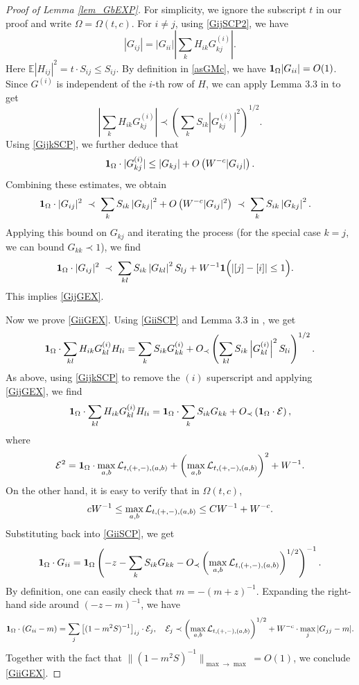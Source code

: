 \documentclass[10pt,reqno]{article}
\theoremstyle{plain} %
\theoremstyle{remark}
\numberwithin{equation}{section}
\begin{document}
\begin{proof}[Proof of Lemma \ref{lem_GbEXP}]
For simplicity, we ignore the subscript \( t \) in our proof and write \( \Omega = \Omega(t, c) \). For \( i \neq j \), using \eqref{GijSCP2}, we have
\[
|G_{ij}| = |G_{ii}| \left| \sum_{k} H_{ik} G^{(i)}_{kj} \right|.
\]
Here \( \mathbb{E} |H_{ij}|^2 = t \cdot S_{ij} \leq S_{ij} \). By definition in \eqref{asGMc}, we have $
{\bf 1}_{\Omega} |G_{ii}| = O(1)$. 
Since \( G^{(i)} \) is independent of the \( i \)-th row of \( H \), we can apply Lemma 3.3 in \cite{erdHos2012rigidity} to get
\[
\left| \sum_{k} H_{ik} G^{(i)}_{kj} \right| \prec 
\left( \sum_{k} S_{ik} \left| G^{(i)}_{kj} \right|^2 \right)^{1/2}.
\]
Using \eqref{GijkSCP}, we further deduce that
\[
{\bf 1}_{\Omega} \cdot |G^{(i)}_{kj}| \leq |G_{kj}| + O\left(W^{-c} |G_{ij}|\right).
\]
Combining these estimates, we obtain
\begin{align}
{\bf 1}_{\Omega} \cdot |G_{ij}|^2 & \;\prec\; \sum_{k} S_{ik} \left| G_{kj} \right|^2 + O\left(W^{-c} |G_{ij}|^2\right) 
 \;\prec\; \sum_{k} S_{ik} \left| G_{kj} \right|^2.
\end{align}
Applying this bound on \( G_{kj} \) and iterating the process (for the special case \( k = j \), we can bound \( G_{kk} \prec 1 \)), we find
\begin{align}
{\bf 1}_{\Omega} \cdot |G_{ij}|^2 & \;\prec\; \sum_{kl} S_{ik} \left| G_{kl} \right|^2 S_{lj} +
W^{-1} {\bf 1}\Big(|[j] - [i]| \leq 1\Big).
\end{align}
This implies \eqref{GijGEX}.

Now we prove \eqref{GiiGEX}. Using \eqref{GiiSCP} and Lemma 3.3 in \cite{erdHos2012rigidity}, we get
\[
{\bf 1}_{\Omega} \cdot \sum_{kl} H_{ik} G^{(i)}_{kl} H_{li} =
\sum_{k} S_{ik} G^{(i)}_{kk} +
O_\prec\left(\sum_{kl} S_{ik} \left| G^{(i)}_{kl} \right|^2 S_{li} \right)^{1/2}.
\]
As above, using \eqref{GijkSCP} to remove the \( (i) \) superscript and applying \eqref{GijGEX}, we find
\[
{\bf 1}_{\Omega} \cdot \sum_{kl} H_{ik} G^{(i)}_{kl} H_{li} =
{\bf 1}_{\Omega} \cdot \sum_{k} S_{ik} G_{kk} + O_\prec\left({\bf 1}_{\Omega} \cdot {\cal E}\right),
\]
where
\[
{\cal E}^2 = {\bf 1}_{\Omega} \cdot \max_{a,b} {\cal L}_{t,(+,-),(a,b)} +
\left(\max_{a,b} {\cal L}_{t,(+,-),(a,b)}\right)^2 + W^{-1}.
\]
On the other hand, it is easy to verify that in \( \Omega(t, c) \),
\[
c W^{-1} \leq \max_{a,b} {\cal L}_{t,(+,-),(a,b)} \leq C W^{-1} + W^{-c}.
\]
Substituting back into \eqref{GiiSCP}, we get
\[
{\bf 1}_{\Omega} \cdot G_{ii} =
{\bf 1}_{\Omega} \left(-z - \sum_{k} S_{ik} G_{kk} - O_\prec \left(\max_{a,b} {\cal L}_{t,(+,-),(a,b)}\right)^{1/2} \right)^{-1}.
\]
By definition, one can easily check that \( m = -(m + z)^{-1} \). Expanding the right-hand side around \( (-z - m)^{-1} \), we have
\[
{\bf 1}_{\Omega} \cdot \left( G_{ii} - m \right) =
\sum_j \left[ (1 - m^2 S)^{-1} \right]_{ij} \cdot {\cal E}_j, \quad {\cal E}_j \prec \left( \max_{a,b} {\cal L}_{t,(+,-),(a,b)} \right)^{1/2}+W^{-c}\cdot \max_j|G_{jj}-m|.
\]
Together with the fact that \( \|(1 - m^2 S)^{-1}\|_{\max \to \max} = O(1) \), we conclude \eqref{GiiGEX}.


\end{proof}
\end{document}
